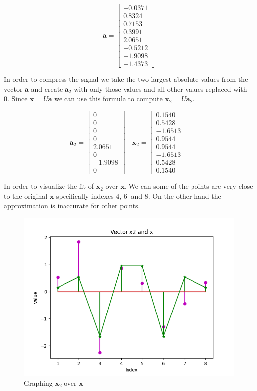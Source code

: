 \documentclass{article}
\newcommand{\bs}[1]{\boldsymbol{#1}}
\begin{document}
$$\bs{a} = \begin{bmatrix} -0.0371 \\ 0.8324 \\ 0.7153 \\ 0.3991 \\ 2.0651 \\ -0.5212 \\ -1.9098 \\ -1.4373 \end{bmatrix}$$
	
In order to compress the signal we take the two largest absolute values from the vector $\bs{a}$ and create $\bs{a}_2$ with only those values and all other values replaced with 0. Since $\bs{x} = U\bs{a}$ we can use this formula to compute $\bs{x}_2 = U\bs{a}_2$. 

$$
\bs{a}_2 = \begin{bmatrix} 0 \\ 0 \\ 0 \\ 0 \\ 2.0651 \\ 0 \\ -1.9098 \\ 0  \end{bmatrix} 
\quad
\bs{x}_2 = \begin{bmatrix} 0.1540 \\ 0.5428 \\ -1.6513 \\ 0.9544 \\ 0.9544 \\ -1.6513 \\ 0.5428 \\ 0.1540 \end{bmatrix}
$$

In order to visualize the fit of $\bs{x}_2$ over $\bs{x}$. We can some of the points are very close to the original $\bs{x}$ specifically indexes 4, 6, and 8. On the other hand the approximation is inaccurate for other points. 

\begin{figure}[h!]
	\centering
	\includegraphics[scale=0.5]{CA_01Figure_4.png}
	\caption{Graphing $\bs{x}_2$ over $\bs{x}$} 
	\label{fig: FIG 04}
\end{figure}
\end{document}
